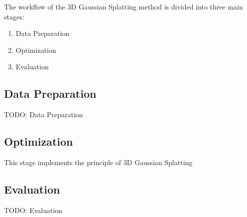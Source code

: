 The workflow of the 3D Gaussian Splatting method is divided into three main stages: 
\begin{enumerate}
    \item Data Preparation
    \item Optimization
    \item Evaluation
\end{enumerate}

\subsection{Data Preparation}

TODO: Data Preparation

\subsection{Optimization}

This stage implements the principle of 3D Gaussian Splatting



\subsection{Evaluation}

TODO: Evaluation